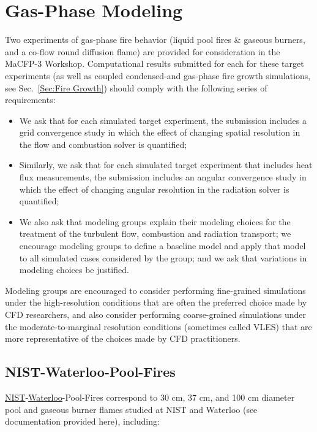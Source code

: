 \documentclass[12pt]{article}
\begin{document}
\clearpage
\section{Gas-Phase Modeling}
\label{Sec:Gas Phase}
Two experiments of gas-phase fire behavior (liquid pool fires \& gaseous burners, and a co-flow round diffusion flame) are provided for consideration in the MaCFP-3 Workshop.  Computational results submitted for each for these target experiments (as well as coupled condensed-and gas-phase fire growth simulations, see Sec.~\ref{Sec:Fire Growth}) should comply with the following series of requirements:

\begin{itemize}[noitemsep]
\item We ask that for each simulated target experiment, the submission includes a grid convergence study in which the effect of changing spatial resolution in the flow and combustion solver is quantified;
\item Similarly, we ask that for each simulated target experiment that includes heat flux measurements, the submission includes an angular convergence study in which the effect of changing angular resolution in the radiation solver is quantified;
\item We also ask that modeling groups explain their modeling choices for the treatment of the turbulent flow, combustion and radiation transport; we encourage modeling groups to define a baseline model and apply that model to all simulated cases considered by the group; and we ask that variations in modeling choices be justified.
 \end{itemize}

Modeling groups are encouraged to consider performing fine-grained simulations under the high-resolution conditions that are often the preferred choice made by CFD researchers, and also consider performing coarse-grained simulations under the moderate-to-marginal resolution conditions (sometimes called VLES) that are more representative of the choices made by CFD practitioners.

\subsection{NIST-Waterloo-Pool-Fires}
\href{https://github.com/MaCFP/macfp-db/tree/master/Liquid_Pool_Fires/NIST_Pool_Fires}{NIST}-\href{https://github.com/MaCFP/macfp-db/tree/master/Liquid_Pool_Fires/Waterloo_Methanol}{Waterloo}-Pool-Fires correspond to 30 cm, 37 cm, and 100 cm diameter pool and gaseous burner flames studied at NIST and Waterloo (see documentation provided here), including: 
\end{document}
